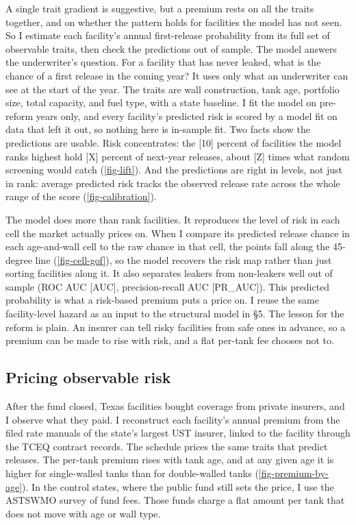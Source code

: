\documentclass[
  12pt,
]{article}
\begin{document}
A single trait gradient is suggestive, but a premium rests on all the
traits together, and on whether the pattern holds for facilities the
model has not seen. So I estimate each facility's annual first-release
probability from its full set of observable traits, then check the
predictions out of sample. The model answers the underwriter's question.
For a facility that has never leaked, what is the chance of a first
release in the coming year? It uses only what an underwriter can see at
the start of the year. The traits are wall construction, tank age,
portfolio size, total capacity, and fuel type, with a state baseline. I
fit the model on pre-reform years only, and every facility's predicted
risk is scored by a model fit on data that left it out, so nothing here
is in-sample fit. Two facts show the predictions are usable. Risk
concentrates: the {[}10{]} percent of facilities the model ranks highest
hold {[}X{]} percent of next-year releases, about {[}Z{]} times what
random screening would catch (\autoref{fig-lift}). And the predictions
are right in levels, not just in rank: average predicted risk tracks the
observed release rate across the whole range of the score
(\autoref{fig-calibration}).

The model does more than rank facilities. It reproduces the level of
risk in each cell the market actually prices on. When I compare its
predicted release chance in each age-and-wall cell to the raw chance in
that cell, the points fall along the 45-degree line
(\autoref{fig-cell-gof}), so the model recovers the risk map rather than
just sorting facilities along it. It also separates leakers from
non-leakers well out of sample (ROC AUC {[}AUC{]}, precision-recall AUC
{[}PR\_AUC{]}). This predicted probability is what a risk-based premium
puts a price on. I reuse the same facility-level hazard as an input to
the structural model in §5. The lesson for the reform is plain. An
insurer can tell risky facilities from safe ones in advance, so a
premium can be made to rise with risk, and a flat per-tank fee chooses
not to.

\subsection{Pricing observable risk}\label{pricing-observable-risk}

After the fund closed, Texas facilities bought coverage from private
insurers, and I observe what they paid. I reconstruct each facility's
annual premium from the filed rate manuals of the state's largest UST
insurer, linked to the facility through the TCEQ contract records. The
schedule prices the same traits that predict releases. The per-tank
premium rises with tank age, and at any given age it is higher for
single-walled tanks than for double-walled tanks
(\autoref{fig-premium-by-age}). In the control states, where the public
fund still sets the price, I use the ASTSWMO survey of fund fees. Those
funds charge a flat amount per tank that does not move with age or wall
type.
\end{document}

